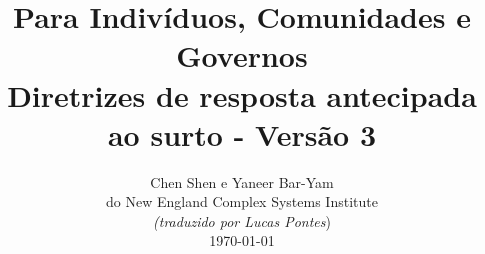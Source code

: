 \documentclass[onecolumn,journal]{IEEEtran}
\begin{document}
\title{\color{Brown}  Para Indivíduos, Comunidades e Governos \\
Diretrizes de resposta antecipada ao surto - Versão 3 \\
\vspace{-0.35ex}}
\author{Chen Shen e Yaneer Bar-Yam \\ do New England Complex Systems Institute \\
\vspace{+0.35ex}
\small{\textit{(traduzido por Lucas Pontes})}\\
 \today
  \vspace{-8ex} \\
\textbf{}
 }

\maketitle




\thispagestyle{empty} %




\end{document}
